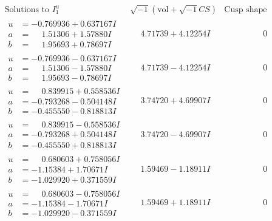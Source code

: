 \documentclass[1p]{elsarticle_modified}
\theoremstyle{definition}
\newcommand{\I}{\sqrt{-1}}
\begin{document}
$$\begin{array}{c|c|c}  
\text{Solutions to }I^u_{1}& \I (\text{vol} + \sqrt{-1}CS) & \text{Cusp shape}\\
 \hline 
\begin{aligned}
u &= -0.769936 + 0.637167 I \\
a &= \phantom{-}1.51306 + 1.57880 I \\
b &= \phantom{-}1.95693 + 0.78697 I\end{aligned}
 & \phantom{-}4.71739 + 4.12254 I & \phantom{-0.000000 } 0 \\ \hline\begin{aligned}
u &= -0.769936 - 0.637167 I \\
a &= \phantom{-}1.51306 - 1.57880 I \\
b &= \phantom{-}1.95693 - 0.78697 I\end{aligned}
 & \phantom{-}4.71739 - 4.12254 I & \phantom{-0.000000 } 0 \\ \hline\begin{aligned}
u &= \phantom{-}0.839915 + 0.558536 I \\
a &= -0.793268 - 0.504148 I \\
b &= -0.455550 - 0.818813 I\end{aligned}
 & \phantom{-}3.74720 + 4.69907 I & \phantom{-0.000000 } 0 \\ \hline\begin{aligned}
u &= \phantom{-}0.839915 - 0.558536 I \\
a &= -0.793268 + 0.504148 I \\
b &= -0.455550 + 0.818813 I\end{aligned}
 & \phantom{-}3.74720 - 4.69907 I & \phantom{-0.000000 } 0 \\ \hline\begin{aligned}
u &= \phantom{-}0.680603 + 0.758056 I \\
a &= -1.15384 + 1.70671 I \\
b &= -1.029920 + 0.371559 I\end{aligned}
 & \phantom{-}1.59469 - 1.18911 I & \phantom{-0.000000 } 0 \\ \hline\begin{aligned}
u &= \phantom{-}0.680603 - 0.758056 I \\
a &= -1.15384 - 1.70671 I \\
b &= -1.029920 - 0.371559 I\end{aligned}
 & \phantom{-}1.59469 + 1.18911 I & \phantom{-0.000000 } 0 \\ \hline\begin{aligned}

\end{aligned}
\end{array}$$
\end{document}

